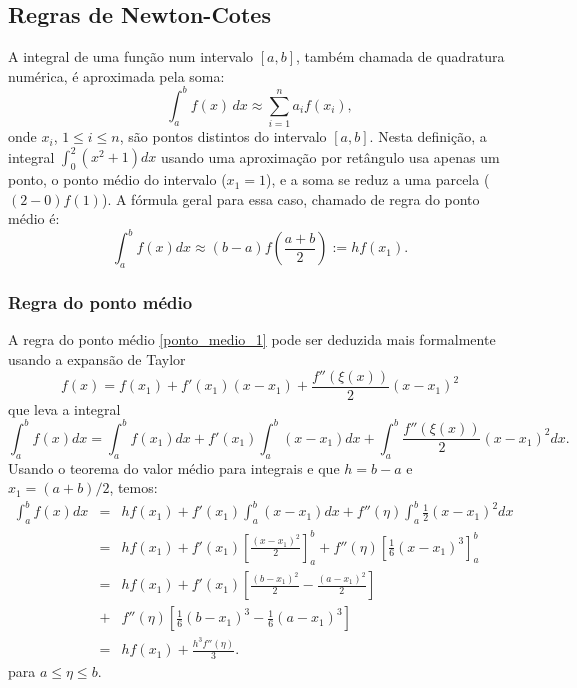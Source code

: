 \subsection{Regras de Newton-Cotes}

A integral de uma função num intervalo $[a, b]$, também chamada de quadratura numérica, é aproximada pela soma:
\begin{equation*}
  \int_a^b f(x)\,dx \approx \sum_{i=1}^n a_if(x_i),
\end{equation*}
onde $x_i$, $1\leq i\leq n$, são pontos distintos do intervalo $[a,b]$. Nesta definição, a integral $\int_0^2(x^2+1)dx$ usando uma aproximação por retângulo usa apenas um ponto, o ponto médio do intervalo ($x_1=1$), e a soma se reduz a uma parcela ($(2-0)f(1)$). A fórmula geral para essa caso, chamado de regra do ponto médio é:
\begin{equation}\label{ponto_medio_1}
\int_a^bf(x)dx\approx (b-a)f\left(\frac{a+b}{2}\right):=hf(x_1).
\end{equation}

\subsubsection{Regra do ponto médio}
A regra do ponto médio \eqref{ponto_medio_1} pode ser deduzida mais formalmente usando a expansão de Taylor
$$
f(x)=f(x_1)+f'(x_1)(x-x_1)+\frac{f''(\xi(x))}{2}(x-x_1)^2
$$
que leva a integral
$$
\int_a^b f(x)dx=\int_a^b f(x_1) dx+f'(x_1)\int_a^b(x-x_1)dx +\int_a^b\frac{f''(\xi(x))}{2}(x-x_1)^2dx.
$$
Usando o teorema do valor médio para integrais e que $h=b-a$ e $x_1=(a+b)/2$, temos:
\begin{eqnarray*}
\int_a^b f(x)dx &=& h f(x_1) + f'(x_1)\int_a^b(x-x_1)dx+f''(\eta)\int_a^b\frac{1}{2}(x-x_1)^2dx\\
&=& h f(x_1) +f'(x_1)\left[\frac{(x-x_1)^2}{2}\right]_a^b+f''(\eta)\left[\frac{1}{6}(x-x_1)^3\right]_a^b\\
&=& h f(x_1) +f'(x_1)\left[\frac{(b-x_1)^2}{2}-\frac{(a-x_1)^2}{2}\right]\\
&+& f''(\eta)\left[\frac{1}{6}(b-x_1)^3-\frac{1}{6}(a-x_1)^3\right]\\
&=& h f(x_1) +\frac{h^3f''(\eta)}{3}.
\end{eqnarray*}
para $a\leq \eta\leq b$.

